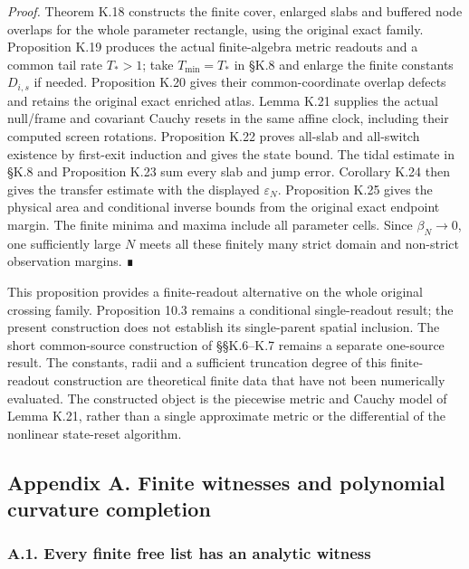 \documentclass[
  english,
  11pt,
  reqno]{amsart}
\begin{document}
\emph{Proof.} Theorem K.18 constructs the finite cover, enlarged slabs
and buffered node overlaps for the whole parameter rectangle, using the
original exact family. Proposition K.19 produces the actual
finite-algebra metric readouts and a common tail rate \(T_*>1\); take
\(T_{\min}=T_*\) in §K.8 and enlarge the finite constants \(D_{i,s}\) if
needed. Proposition K.20 gives their common-coordinate overlap defects
and retains the original exact enriched atlas. Lemma K.21 supplies the
actual null/frame and covariant Cauchy resets in the same affine clock,
including their computed screen rotations. Proposition K.22 proves
all-slab and all-switch existence by first-exit induction and gives the
state bound. The tidal estimate in §K.8 and Proposition K.23 sum every
slab and jump error. Corollary K.24 then gives the transfer estimate
with the displayed \(\varepsilon_N\). Proposition K.25 gives the
physical area and conditional inverse bounds from the original exact
endpoint margin. The finite minima and maxima include all parameter
cells. Since \(\beta_N\to0\), one sufficiently large \(N\) meets all
these finitely many strict domain and non-strict observation margins. ∎

This proposition provides a finite-readout alternative on the whole
original crossing family. Proposition 10.3 remains a conditional
single-readout result; the present construction does not establish its
single-parent spatial inclusion. The short common-source construction of
§§K.6--K.7 remains a separate one-source result. The constants, radii
and a sufficient truncation degree of this finite-readout construction
are theoretical finite data that have not been numerically evaluated.
The constructed object is the piecewise metric and Cauchy model of Lemma
K.21, rather than a single approximate metric or the differential of the
nonlinear state-reset algorithm.

\protect{}\label{app:gg-ordered-jets}

\subsection{Appendix A. Finite witnesses and polynomial curvature
completion}\label{appendix-a.-finite-witnesses-and-polynomial-curvature-completion}

\protect{}\label{sec:gg-finite-witnesses}

\subsubsection{A.1. Every finite free list has an analytic
witness}\label{a.1.-every-finite-free-list-has-an-analytic-witness}
\end{document}
